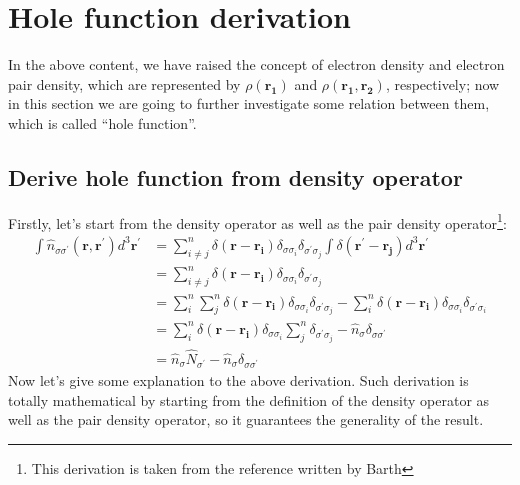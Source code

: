 \section{Hole function derivation}
%
%
In the above content, we have raised the concept of electron density
and electron pair density, which are represented by $\rho(\bm{r_{1}})$
and $\rho(\bm{r_{1}},\bm{r_{2}})$, respectively; now in this section
we are going to further investigate some relation between them, which
is called ``hole function''.

\subsection{Derive hole function from density operator}
\label{DHF_in_density_matrices}
%
%
%
%
%
Firstly, let's start from the density operator as well as the pair
density operator\footnote{This derivation is taken from the reference
  written by Barth\cite{2004PhST..109....9V}}:
\begin{equation}
\label{DMeq:44}
\begin{split}
  \int \hat{n}_{\sigma\sigma^{'}}(\bm{r}, \bm{r^{'}})d^{3}\bm{r^{'}} &=
  \sum_{i\neq j}^{n}\delta(\bm{r} - \bm{r_{i}})
  \delta_{\sigma\sigma_{i}}\delta_{\sigma^{'}\sigma_{j}}
  \int\delta(\bm{r^{'}} - \bm{r_{j}})d^{3}\bm{r^{'}} \\
  &= \sum_{i\neq j}^{n}\delta(\bm{r} -
  \bm{r_{i}})\delta_{\sigma\sigma_{i}}
  \delta_{\sigma^{'}\sigma_{j}} \\
  &= \sum_{i}^{n}\sum_{j}^{n}\delta(\bm{r} -
  \bm{r_{i}})\delta_{\sigma\sigma_{i}}
  \delta_{\sigma^{'}\sigma_{j}} - \sum_{i}^{n}\delta(\bm{r} -
  \bm{r_{i}})\delta_{\sigma\sigma_{i}}
  \delta_{\sigma^{'}\sigma_{i}} \\
  &= \sum_{i}^{n}\delta(\bm{r} -
  \bm{r_{i}})\delta_{\sigma\sigma_{i}}
  \sum_{j}^{n}\delta_{\sigma^{'}\sigma_{j}} -
  \hat{n}_{\sigma}\delta_{\sigma\sigma^{'}} \\
  &= \hat{n}_{\sigma}\hat{N}_{\sigma^{'}} -
  \hat{n}_{\sigma}\delta_{\sigma\sigma^{'}}
\end{split}
\end{equation}
Now let's give some explanation to the above derivation. Such
derivation is totally mathematical by starting from the definition of
the density operator as well as the pair density operator, so it
guarantees the generality of the result.

